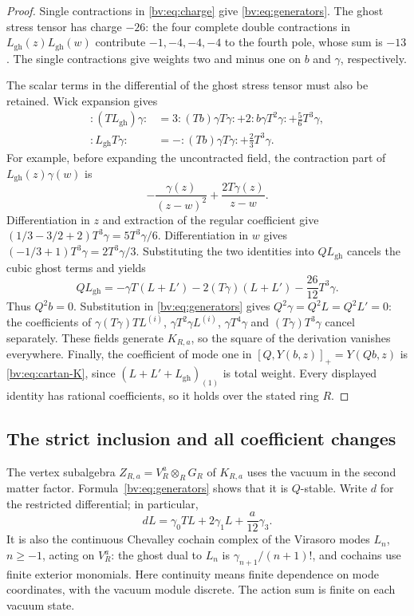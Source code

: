 \begin{proof}
Single contractions in \eqref{bv:eq:charge} give
\eqref{bv:eq:generators}.  The ghost stress tensor has charge \(-26\):
the four complete double contractions in
\(L_{\mathrm{gh}}(z)L_{\mathrm{gh}}(w)\) contribute
\(-1,-4,-4,-4\) to the fourth pole, whose sum is \(-13\).
The single contractions give weights two and minus one on \(b\)
and \(\gamma\), respectively.

The scalar terms in the differential of the ghost stress tensor must
also be retained.  Wick expansion gives
\[
 \begin{aligned}
 {:}(TL_{\mathrm{gh}})\gamma{:}
   &=3{:}(Tb)\gamma T\gamma{:}
       +2{:}b\gamma T^2\gamma{:}+\frac56T^3\gamma,\\
 {:}L_{\mathrm{gh}}T\gamma{:}
   &=-{:}(Tb)\gamma T\gamma{:}+\frac23T^3\gamma.
 \end{aligned}
\]
For example, before expanding the uncontracted field, the contraction
part of \(L_{\mathrm{gh}}(z)\gamma(w)\) is
\[
 -\frac{\gamma(z)}{(z-w)^2}+\frac{2T\gamma(z)}{z-w}.
\]
Differentiation in \(z\) and extraction of the regular coefficient
give \((1/3-3/2+2)T^3\gamma=5T^3\gamma/6\).
Differentiation in \(w\) gives
\((-1/3+1)T^3\gamma=2T^3\gamma/3\).
Substituting the two identities into \(QL_{\mathrm{gh}}\) cancels
the cubic ghost terms and yields
\[
 QL_{\mathrm{gh}}
 =-\gamma T(L+L')-2(T\gamma)(L+L')-\frac{26}{12}T^3\gamma.
\]
Thus \(Q^2b=0\).  Substitution in
\eqref{bv:eq:generators} gives \(Q^2\gamma=Q^2L=Q^2L'=0\): the
coefficients of \(\gamma(T\gamma)TL^{(i)}\),
\(\gamma T^2\gamma L^{(i)}\), \(\gamma T^4\gamma\) and
\((T\gamma)T^3\gamma\) cancel separately.  These fields generate
\(K_{R,a}\), so the square of the derivation vanishes everywhere.
Finally, the coefficient of mode one in
\([Q,Y(b,z)]_+=Y(Qb,z)\) is \eqref{bv:eq:cartan-K}, since
\((L+L'+L_{\mathrm{gh}})_{(1)}\) is total weight.
Every displayed identity has rational coefficients, so it holds over
the stated ring \(R\).
\end{proof}

\subsection{The strict inclusion and all coefficient changes}

The vertex subalgebra
\(Z_{R,a}=V_R^a\otimes_R G_R\) of \(K_{R,a}\) uses the vacuum in
the second matter factor.  Formula~\eqref{bv:eq:generators} shows
that it is \(Q\)-stable.  Write \(d\) for the restricted differential;
in particular,
\[
 dL=\gamma_0TL+2\gamma_1L+\frac a{12}\gamma_3.
\]
It is also the continuous Chevalley cochain complex of the Virasoro
modes \(L_n\), \(n\geq-1\), acting on \(V_R^a\): the ghost dual
to \(L_n\) is \(\gamma_{n+1}/(n+1)!\), and cochains use finite
exterior monomials.  Here continuity means finite dependence on mode
coordinates, with the vacuum module discrete.  The action sum is
finite on each vacuum state.

